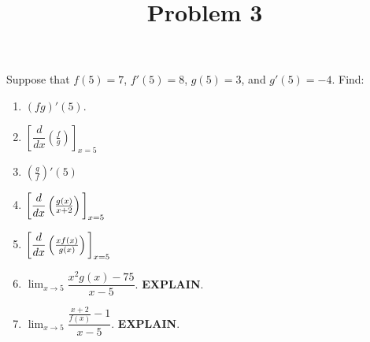 \documentclass{ximera}
\title[Problem 3]{Problem 3}
\begin{document}
\begin{abstract} \end{abstract}
\maketitle

\begin{problem}
Suppose that $f(5) = 7$, $f'(5) = 8$, $g(5) = 3$, and $g'(5) = -4$.  Find:

	\begin{enumerate}

	\item  $(fg)'(5)$.
\item $\left[ \dfrac{d}{dx} \left( \frac{f}{g} \right) \right]_{x=5}$
\item $ \left( \frac{g}{f} \right)' (5)$
\item  $\bigg[  \dfrac{d}{dx} \left( \frac{g(x)}{x+2} \right) \bigg]_{x=5}$
\item $\bigg[  \dfrac{d}{dx} \left( \frac{xf(x)}{g(x)} \right) \bigg]_{x=5}$
\item $\displaystyle \lim_{x\to 5} \dfrac{x^2 g(x) - 75 }{x-5}$. \textbf{EXPLAIN}.
\item $\displaystyle \lim_{x\to 5} \dfrac{\frac{x+2}{f(x)} - 1 }{x-5}$. \textbf{EXPLAIN}.
\end{enumerate}
		
\end{problem}
\end{document}
